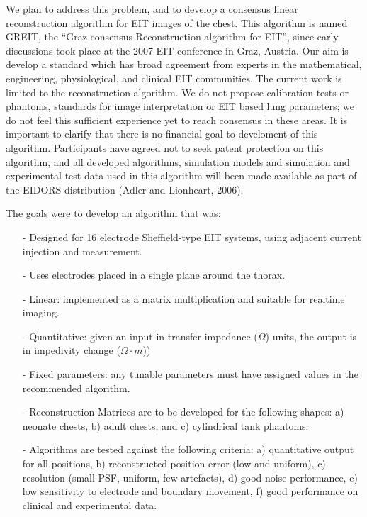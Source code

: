 \documentclass[letterpaper,twocolumn,11pt]{article}
\begin{document}
We plan to address this problem, and to develop a
consensus linear reconstruction algorithm for EIT
images of the chest.
This algorithm is named GREIT, 
the ``Graz consensus Reconstruction algorithm for EIT'',
since early discussions took place at the 2007 EIT conference
in Graz, Austria. Our aim is develop a standard which
has broad agreement from experts in the mathematical,
engineering, physiological, and clinical EIT communities.
The current work is limited to the reconstruction algorithm.
We do not propose calibration tests or phantoms, standards
for image interpretation or EIT based lung parameters; 
we do not feel this sufficient experience yet to reach
consensus in these areas.
It is important to clarify that there is no financial
goal to develoment of this algorithm. Participants have
agreed not to seek patent protection on this algorithm,
and all developed algorithms, simulation
models and simulation and experimental test data used
in this algorithm will been made available as part of
the EIDORS distribution (Adler and Lionheart, 2006).

The goals were to develop an algorithm that was:
\vspace{-9pt}%
\begin{itemize}
  \setlength{\itemsep}{0cm}%
  \setlength{\parskip}{0cm}%
\item[-] Designed for 16 electrode Sheffield-type EIT systems, using
      adjacent current injection and measurement.
\item[-] Uses electrodes placed in a single plane around the thorax.
\item[-] Linear: implemented as a matrix multiplication and suitable
              for realtime imaging.
\item[-] Quantitative: given an input in transfer impedance ($\Omega$) units,
                    the output is in impedivity change ($\Omega\cdot m$))
\item[-] Fixed parameters: any tunable parameters must have assigned
                    values in the recommended algorithm.
\item[-] Reconstruction Matrices are to be developed for the
      following shapes:
   a) neonate chests, 
   b) adult chests, and 
   c) cylindrical tank phantoms.
\item[-] Algorithms are tested against the following criteria:
    a) quantitative output for all positions,
    b) reconstructed position error (low and uniform),
    c) resolution (small PSF, uniform, few artefacts),
    d) good noise performance,
    e) low sensitivity to electrode and boundary movement,
    f) good performance on clinical and experimental data.
\end{itemize}
\end{document}
